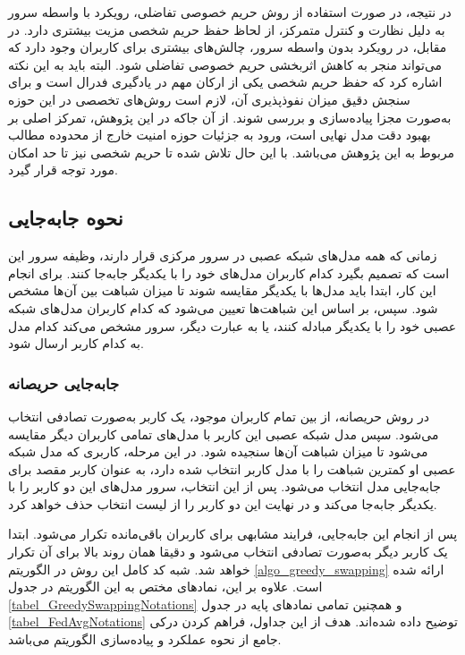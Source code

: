 در نتیجه، در صورت استفاده از روش حریم خصوصی تفاضلی، رویکرد با واسطه سرور به دلیل نظارت و کنترل متمرکز، از لحاظ حفظ حریم شخصی مزیت بیشتری دارد. در مقابل، در رویکرد بدون واسطه سرور، چالش‌های بیشتری برای کاربران وجود دارد که می‌تواند منجر به کاهش اثربخشی حریم خصوصی تفاضلی شود.
البته باید به این نکته اشاره کرد که حفظ حریم شخصی یکی از ارکان مهم در یادگیری فدرال است و برای سنجش دقیق میزان نفوذپذیری آن، لازم است روش‌های تخصصی در این حوزه به‌صورت مجزا پیاده‌سازی و بررسی شوند.
از آن جاکه در این پژوهش، تمرکز اصلی بر بهبود دقت مدل نهایی است، ورود به جزئیات حوزه امنیت خارج از محدوده مطالب مربوط به این پژوهش می‌باشد. با این حال تلاش شده تا حریم شخصی نیز تا حد امکان مورد توجه قرار گیرد.





\subsection{نحوه جابه‌جایی}
زمانی که همه مدل‌های شبکه عصبی در سرور مرکزی قرار دارند، وظیفه سرور این است که تصمیم بگیرد کدام کاربران مدل‌های خود را با یکدیگر جابه‌جا کنند. برای انجام این کار، ابتدا باید مدل‌ها با یکدیگر مقایسه شوند تا میزان شباهت بین آن‌ها مشخص شود. سپس، بر اساس این شباهت‌ها تعیین می‌شود که کدام کاربران مدل‌های شبکه عصبی خود را با یکدیگر مبادله کنند، یا به عبارت دیگر، سرور مشخص می‌کند کدام مدل به کدام کاربر ارسال شود.

\subsubsection{جابه‌جایی حریصانه}

در روش حریصانه، از بین تمام کاربران موجود، یک کاربر به‌صورت تصادفی انتخاب می‌شود. سپس مدل شبکه عصبی این کاربر با مدل‌های تمامی کاربران دیگر مقایسه می‌شود تا میزان شباهت آن‌ها سنجیده شود. در این مرحله، کاربری که مدل شبکه عصبی او کمترین شباهت را با مدل کاربر انتخاب‌ شده دارد، به عنوان کاربر مقصد برای جابه‌جایی مدل انتخاب می‌شود. پس از این انتخاب، سرور مدل‌های این دو کاربر را با یکدیگر جابه‌جا می‌کند و در نهایت این دو کاربر را از لیست انتخاب حذف خواهد کرد.

پس از انجام این جابه‌جایی، فرایند مشابهی برای کاربران باقی‌مانده تکرار می‌شود. ابتدا یک کاربر دیگر به‌صورت تصادفی انتخاب می‌شود و دقیقا همان روند بالا برای آن تکرار خواهد شد.
شبه کد کامل این روش در الگوریتم
\ref{algo_greedy_swapping}
ارائه شده است. علاوه بر این، نمادهای مختص به این الگوریتم در جدول
\ref{tabel_GreedySwappingNotations}
و همچنین تمامی نمادهای پایه در جدول
\ref{tabel_FedAvgNotations}
توضیح داده شده‌اند.
هدف از این جداول، فراهم کردن درکی جامع از نحوه عملکرد و پیاده‌سازی الگوریتم می‌باشد.


